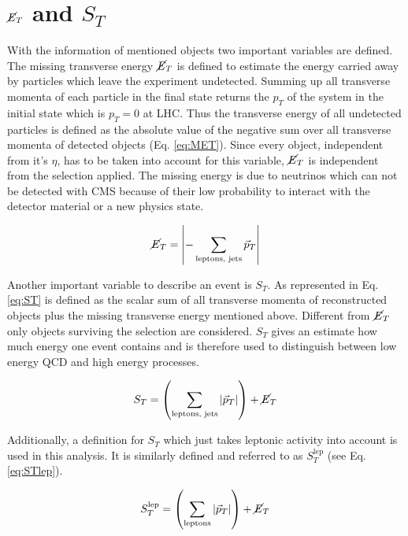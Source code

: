 \section{$\cancel{E}_T$ and $S_T$}
	With the information of mentioned objects two important variables are defined. The missing transverse energy $\cancel{E}_T$ is defined to estimate the energy carried away by particles which leave the experiment undetected. Summing up all transverse momenta of each particle in the final state returns the $p_T$ of the system in the initial state which is $p_T = 0$ at LHC. Thus the transverse energy of all undetected particles is defined as the absolute value of the negative sum over all transverse momenta of detected objects (Eq. \ref{eq:MET}). Since every object, independent from it's $\eta$, has to be taken into account for this variable, $\cancel{E}_T$ is independent from the selection applied. The missing energy is due to neutrinos which can not be detected with CMS because of their low probability to interact with the detector material or a new physics state. 
	
	\begin{equation}
		\cancel{E}_T = \left| - \sum_{\textrm{leptons, jets}}^{} \vec{p}_T \right|
		\label{eq:MET}
	\end{equation}
	
	\noindent Another important variable to describe an event is $S_T$. As represented in Eq. \ref{eq:ST} is defined as the scalar sum of all transverse momenta of reconstructed objects plus the missing transverse energy mentioned above. Different from $\cancel{E}_T$ only objects surviving the selection are considered. $S_T$ gives an estimate how much energy one event contains and is therefore used to distinguish between low energy QCD and high energy processes. 
	
	\begin{equation}
		S_T = \left( \sum_{\textrm{leptons, jets}}^{} \vert \vec{p}_T \vert \right) + \cancel{E}_T
		\label{eq:ST}
	\end{equation}
	
	\noindent Additionally, a definition for $S_T$ which just takes leptonic activity into account is used in this analysis. It is similarly defined and referred to as $S_T^{\text{lep}}$ (see Eq. \ref{eq:STlep}).
	
	\begin{equation}
		S_T^\text{lep} = \left( \sum_{\textrm{leptons}}^{} \vert \vec{p}_T \vert \right) + \cancel{E}_T
		\label{eq:STlep}
	\end{equation}	
